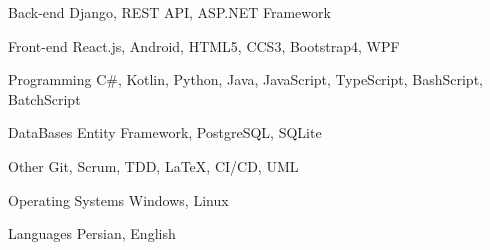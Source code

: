 

\begin{cvskills}

  \cvskill
  {Back-end} %
  {Django, REST API, ASP.NET Framework} %

  \cvskill
  {Front-end} %
  {React.js, Android, HTML5, CCS3, Bootstrap4, WPF} %

  \cvskill
  {Programming} %
  {C\#, Kotlin, Python, Java, JavaScript, TypeScript, BashScript, BatchScript} %

  \cvskill
  {DataBases} %
  {Entity Framework, PostgreSQL, SQLite} %


  \cvskill
  {Other} %
  {Git, Scrum, TDD, \LaTeX, CI/CD, UML} %


  \cvskill
  {Operating Systems} %
  {Windows, Linux} %


  \cvskill
  {Languages} %
  {Persian, English} %


\end{cvskills}
